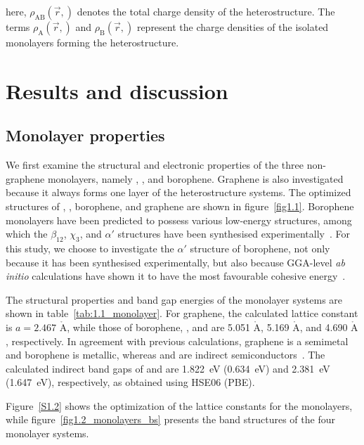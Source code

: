 here, $\rho_{\mathrm{AB}}(\vec{r},)$ denotes the total charge density of the heterostructure.
The terms $\rho_{\mathrm{A}}(\vec{r},)$ and $\rho_{\mathrm{B}}(\vec{r},)$ represent the charge densities of the isolated monolayers forming the heterostructure.

\section{Results and discussion}
\label{1_results}

\subsection{Monolayer properties}

We first examine the structural and electronic properties of the three non-graphene monolayers,
namely , , and borophene.
Graphene is also investigated because it always forms one layer of the heterostructure systems.
The optimized structures of , , borophene,
and graphene are shown in figure~\ref{fig1.1}.
Borophene monolayers have been predicted to possess various low-energy structures,
among which the $\beta_{12}$, $\chi_{3}$, and $\alpha'$ structures have been synthesised experimentally~\cite{kaneti2021borophene}.
For this study, we choose to investigate the $\alpha'$ structure of borophene,
not only because it has been synthesised experimentally,
but also because GGA-level \textit{ab initio} calculations have shown it to have the most favourable cohesive energy~\cite{wu2012two}.

The structural properties and band gap energies of the monolayer systems are shown in table~\ref{tab:1.1_monolayer}.
For graphene, the calculated lattice constant is $a = 2.467$ $\mathring{\mathrm{A}}$,
while those of borophene, , and  are 5.051 $\mathring{\mathrm{A}}$, 5.169 $\mathring{\mathrm{A}}$, and 4.690 $\mathring{\mathrm{A}}$, respectively.
In agreement with previous calculations, graphene is a semimetal and borophene is metallic,
whereas  and  are indirect semiconductors~\cite{zhang2018strain, nosheen2022first}.
The calculated indirect band gaps of  and  are \qty{1.822}{\electronvolt} (\qty{0.634}{\electronvolt}) and \qty{2.381}{\electronvolt} (\qty{1.647}{\electronvolt}), respectively, as obtained using HSE06 (PBE).

Figure~\ref{S1.2} shows the optimization of the lattice constants for the monolayers,
while figure~\ref{fig1.2_monolayers_bs} presents the band structures of the four monolayer systems.

